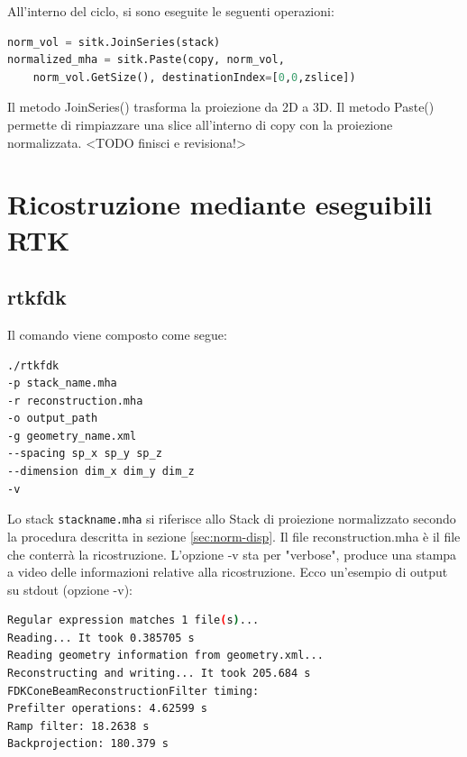\documentclass[a4paper,12pt, doubleside]{report}
\begin{document}
                    All'interno del ciclo, si sono eseguite le seguenti operazioni:
                    \begin{lstlisting}[language=python, frame=bt]
norm_vol = sitk.JoinSeries(stack)
normalized_mha = sitk.Paste(copy, norm_vol, 
    norm_vol.GetSize(), destinationIndex=[0,0,zslice])
                    \end{lstlisting}
                    
                    Il metodo JoinSeries() \cite{sitk-joinseries} trasforma la proiezione da 2D a 3D. Il metodo Paste() \cite{sitk-paste} permette di rimpiazzare una slice all'interno di copy con la proiezione normalizzata. <TODO finisci e revisiona!>
                    
                    
                    
        \section{Ricostruzione mediante eseguibili RTK}
            \subsection{rtkfdk}
                \par
                    Il comando viene composto come segue:
                    \begin{lstlisting}[language=bash, frame=bt]
./rtkfdk 
-p stack_name.mha 
-r reconstruction.mha
-o output_path 
-g geometry_name.xml 
--spacing sp_x sp_y sp_z 
--dimension dim_x dim_y dim_z 
-v
                    \end{lstlisting}
            
                    Lo stack \texttt{stack\textunderscore name.mha} si riferisce allo Stack di proiezione normalizzato secondo la procedura descritta in sezione \ref{sec:norm-disp}. Il file reconstruction.mha è il file che conterrà la ricostruzione. L'opzione -v sta per "verbose", produce una stampa a video delle informazioni relative alla ricostruzione.
                    Ecco un'esempio di output su stdout (opzione -v):
                    \begin{lstlisting}[language=bash, frame=bt]
Regular expression matches 1 file(s)...
Reading... It took 0.385705 s
Reading geometry information from geometry.xml...
Reconstructing and writing... It took 205.684 s
FDKConeBeamReconstructionFilter timing:
Prefilter operations: 4.62599 s
Ramp filter: 18.2638 s
Backprojection: 180.379 s
                    \end{lstlisting}
\end{document}
